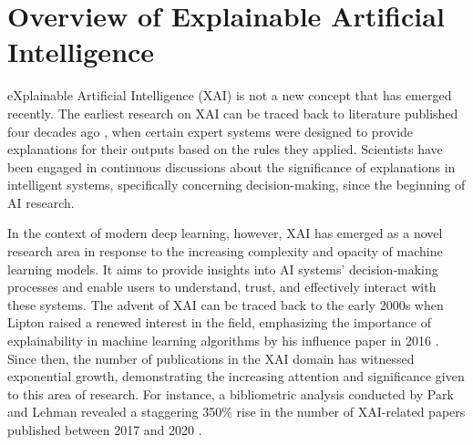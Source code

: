 \section{Overview of Explainable Artificial Intelligence}
\label{sec:xaiOverview}
eXplainable Artificial Intelligence (XAI) is not a new concept that has emerged recently. The earliest research on XAI can be traced back to literature published four decades ago \cite{explanation, explainingPrograms}, when certain expert systems were designed to provide explanations for their outputs based on the rules they applied. Scientists have been engaged in continuous discussions about the significance of explanations in intelligent systems, specifically concerning decision-making, since the beginning of AI research.

In the context of modern deep learning, however, XAI has emerged as a novel research area in response to the increasing complexity and opacity of machine learning models. It aims to provide insights into AI systems' decision-making processes and enable users to understand, trust, and effectively interact with these systems. The advent of XAI can be traced back to the early 2000s when Lipton raised a renewed interest in the field, emphasizing the importance of explainability in machine learning algorithms by his influence paper in 2016 \cite{startOfXAI}. Since then, the number of publications in the XAI domain has witnessed exponential growth, demonstrating the increasing attention and significance given to this area of research. For instance, a bibliometric analysis conducted by Park and Lehman revealed a staggering 350\% rise in the number of XAI-related papers published between 2017 and 2020 \cite{analysisOfXAI}.

